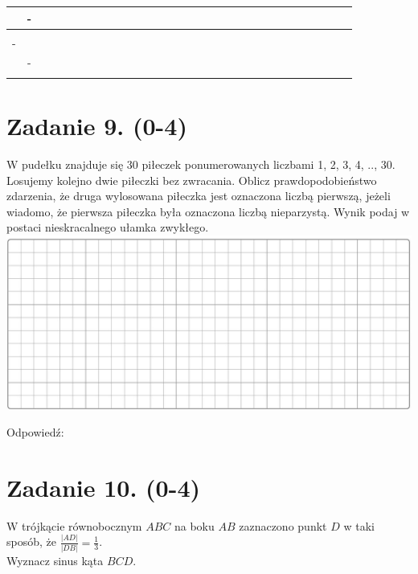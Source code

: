 \documentclass[10pt]{article}
\begin{document}
\begin{center}
\begin{tabular}{|c|c|c|c|c|c|c|c|c|c|c|c|c|c|c|c|c|c|c|c|c|c|c|c|c|c|c|c|c|c|}
\hline
 & - &  &  &  &  &  &  &  &  &  &  &  &  &  &  &  &  &  &  &  &  &  &  &  &  &  &  &  &  \\
\hline
 &  &  &  &  &  &  &  &  &  &  &  &  &  &  &  &  &  &  &  &  &  &  &  &  &  &  &  &  &  \\
\hline
- &  &  &  &  &  &  &  &  &  &  &  &  &  &  &  &  &  &  &  &  &  &  &  &  &  &  &  &  &  \\
\hline
 & - &  &  &  &  &  &  &  &  &  &  &  &  &  &  &  &  &  &  &  &  &  &  &  &  &  &  &  &  \\
\hline
 &  &  &  &  &  &  &  &  &  &  &  &  &  &  &  &  &  &  &  &  &  &  &  &  &  &  &  &  &  \\
\hline
\end{tabular}
\end{center}

\section*{Zadanie 9. (0-4)}
W pudełku znajduje się 30 piłeczek ponumerowanych liczbami 1, 2, 3, 4, .., 30. Losujemy kolejno dwie piłeczki bez zwracania. Oblicz prawdopodobieństwo zdarzenia, że druga wylosowana piłeczka jest oznaczona liczbą pierwszą, jeżeli wiadomo, że pierwsza piłeczka była oznaczona liczbą nieparzystą. Wynik podaj w postaci nieskracalnego ułamka zwykłego.\\
\includegraphics[max width=\textwidth, center]{2024_11_21_599d917d55a506aace4bg-06(1)}

Odpowiedź: \(\qquad\)

\section*{Zadanie 10. (0-4)}
W trójkącie równobocznym \(A B C\) na boku \(A B\) zaznaczono punkt \(D\) w taki sposób, że \(\frac{|A D|}{|D B|}=\frac{1}{3}\).\\
Wyznacz sinus kąta \(B C D\).
\end{document}
